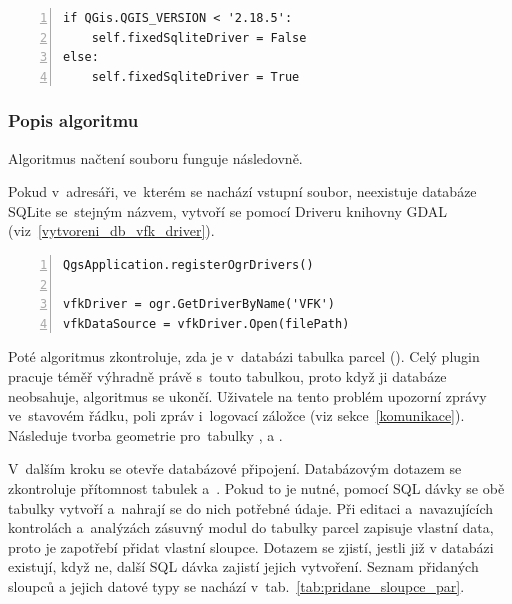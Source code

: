 {\scriptsize
\begin{lstlisting}[style=python, caption={Kontrola verze programu QGIS}, captionpos=b, label=kontrola_verze_qgis, backgroundcolor = \color{light-gray},  numbers=left]
if QGis.QGIS_VERSION < '2.18.5':
    self.fixedSqliteDriver = False
else:
    self.fixedSqliteDriver = True
\end{lstlisting}}

\subsubsection{Popis algoritmu}
\label{popis_algoritmu_nacteni_vfk}

Algoritmus načtení  souboru funguje následovně.

Pokud v~adresáři, ve~kterém se nachází vstupní  soubor, neexistuje databáze SQLite se~stejným názvem, vytvoří se pomocí  Driveru knihovny GDAL (viz~\ref{vytvoreni_db_vfk_driver}).

{\scriptsize
\begin{lstlisting}[style=python, caption={Vytvoření SQLite databáze pomocí VFK Driveru}, captionpos=b, label=vytvoreni_db_vfk_driver, backgroundcolor = \color{light-gray},  numbers=left]
QgsApplication.registerOgrDrivers()

vfkDriver = ogr.GetDriverByName('VFK')
vfkDataSource = vfkDriver.Open(filePath)
\end{lstlisting}}

Poté algoritmus zkontroluje, zda je v~databázi tabulka parcel (). Celý plugin pracuje téměř výhradně právě s~touto tabulkou, proto když ji databáze neobsahuje, algoritmus se ukončí. Uživatele na tento problém upozorní zprávy ve~stavovém řádku, poli zpráv i~logovací záložce (viz sekce~\ref{komunikace}). Následuje tvorba geometrie pro~tabulky ,  a .

V~dalším kroku se otevře databázové připojení. Databázovým dotazem se zkontroluje přítomnost tabulek \textit{} a~\textit{}. Pokud to je nutné, pomocí SQL dávky se obě tabulky vytvoří a~nahrají se do nich potřebné údaje. Při editaci a~navazujících kontrolách a~analýzách zásuvný modul do tabulky parcel zapisuje vlastní data, proto je zapotřebí přidat vlastní sloupce. Dotazem se zjistí, jestli již v databázi existují, když ne, další SQL dávka zajistí jejich vytvoření. Seznam přidaných sloupců a jejich datové typy se nachází v~tab.~\ref{tab:pridane_sloupce_par}.

